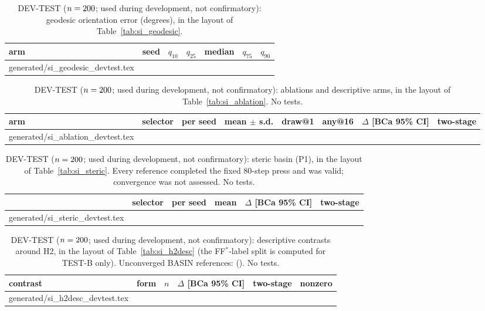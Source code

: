 \documentclass[journal=acsodf,manuscript=article]{achemso}
\makeatletter
\newcommand{\inputrows}[1]{\@@input #1 }
\newcommand{\devlabel}{DEV-TEST ($n=\svNDev$; used during development, not confirmatory)}
\makeatother
\begin{document}
\begin{table}[htbp]
\caption{\devlabel: geodesic orientation error (degrees), in the layout of
Table~\ref{tab:si_geodesic}.}
\label{tab:si_dev_geodesic}
\centering
\small
\begin{tabular}{@{}llccccc@{}}
\toprule
arm & seed & $q_{10}$ & $q_{25}$ & median & $q_{75}$ & $q_{90}$ \\
\midrule
\inputrows{generated/si_geodesic_devtest.tex}
\bottomrule
\end{tabular}
\end{table}

\begin{table}[htbp]
\caption{\devlabel: ablations and descriptive arms, in the layout of
Table~\ref{tab:si_ablation}. No tests.}
\label{tab:si_dev_ablation}
\centering
\scriptsize
\setlength{\tabcolsep}{3pt}
\begin{tabular}{@{}llcccccc@{}}
\toprule
arm & selector & per seed & mean $\pm$ s.d. & draw@1 & any@16 & $\Delta$ [BCa 95\% CI] & two-stage \\
\midrule
\inputrows{generated/si_ablation_devtest.tex}
\bottomrule
\end{tabular}
\end{table}

\begin{table}[htbp]
\caption{\devlabel: steric basin (P1), in the layout of Table~\ref{tab:si_steric}. Every
reference completed the fixed 80-step press and was valid; convergence was not assessed. No
tests.}
\label{tab:si_dev_steric}
\centering
\footnotesize
\begin{tabular}{@{}p{3.4cm}lcccc@{}}
\toprule
 & selector & per seed & mean & $\Delta$ [BCa 95\% CI] & two-stage \\
\midrule
\inputrows{generated/si_steric_devtest.tex}
\bottomrule
\end{tabular}
\end{table}

\begin{table}[htbp]
\caption{\devlabel: descriptive contrasts around H2, in the layout of
Table~\ref{tab:si_h2desc} (the FF$^\ast$-label split is computed for TEST-B only). Unconverged
BASIN references: \svBasinUnconvNDev{} (\svBasinUnconvDev). No tests.}
\label{tab:si_dev_h2desc}
\centering
\footnotesize
\setlength{\tabcolsep}{3pt}
\begin{tabular}{@{}p{5.0cm}lrccr@{}}
\toprule
contrast & form & $n$ & $\Delta$ [BCa 95\% CI] & two-stage & nonzero \\
\midrule
\inputrows{generated/si_h2desc_devtest.tex}
\bottomrule
\end{tabular}
\end{table}
\end{document}
